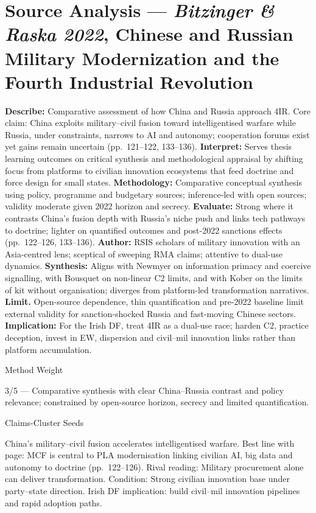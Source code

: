 \section*{Source Analysis — \textit{Bitzinger & Raska 2022}, Chinese and Russian Military Modernization and the Fourth Industrial Revolution}
\textbf{Describe:} Comparative assessment of how China and Russia approach 4IR. Core claim: China exploits military–civil fusion toward intelligentised warfare while Russia, under constraints, narrows to AI and autonomy; cooperation forums exist yet gains remain uncertain (pp.~121–122, 133–136).
\textbf{Interpret:} Serves thesis learning outcomes on critical synthesis and methodological appraisal by shifting focus from platforms to civilian innovation ecosystems that feed doctrine and force design for small states.
\textbf{Methodology:} Comparative conceptual synthesis using policy, programme and budgetary sources; inference-led with open sources; validity moderate given 2022 horizon and secrecy.
\textbf{Evaluate:} Strong where it contrasts China’s fusion depth with Russia’s niche push and links tech pathways to doctrine; lighter on quantified outcomes and post-2022 sanctions effects (pp.~122–126, 133–136).
\textbf{Author:} RSIS scholars of military innovation with an Asia-centred lens; sceptical of sweeping RMA claims; attentive to dual-use dynamics.
\textbf{Synthesis:} Aligns with Newmyer on information primacy and coercive signalling, with Bousquet on non-linear C2 limits, and with Kober on the limits of kit without organisation; diverges from platform-led transformation narratives.
\textbf{Limit.} Open-source dependence, thin quantification and pre-2022 baseline limit external validity for sanction-shocked Russia and fast-moving Chinese sectors.
\textbf{Implication:} For the Irish DF, treat 4IR as a dual-use race; harden C2, practice deception, invest in EW, dispersion and civil–mil innovation links rather than platform accumulation.

Method Weight

3/5 — Comparative synthesis with clear China–Russia contrast and policy relevance; constrained by open-source horizon, secrecy and limited quantification.

Claims-Cluster Seeds

China’s military–civil fusion accelerates intelligentised warfare.
Best line with page: MCF is central to PLA modernisation linking civilian AI, big data and autonomy to doctrine (pp.~122–126).
Rival reading: Military procurement alone can deliver transformation.
Condition: Strong civilian innovation base under party–state direction.
Irish DF implication: build civil–mil innovation pipelines and rapid adoption paths.

